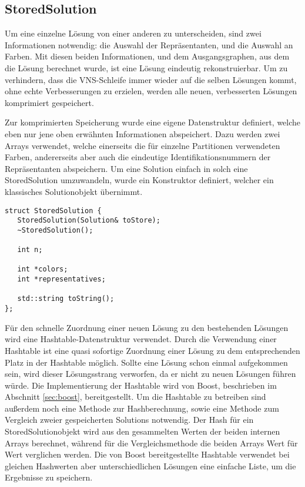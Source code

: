 \subsection{StoredSolution}
Um eine einzelne Lösung von einer anderen zu unterscheiden, sind zwei Informationen notwendig: die Auswahl der Repräsentanten, und die Auswahl 
an Farben. Mit diesen beiden Informationen, und dem Ausgangsgraphen, aus dem die Lösung berechnet wurde, ist eine Lösung eindeutig rekonstruierbar.
Um zu verhindern, dass die VNS-Schleife immer wieder auf die selben Lösungen kommt, ohne echte Verbesserungen zu erzielen, werden alle neuen, verbesserten
Lösungen komprimiert gespeichert. 

Zur komprimierten Speicherung wurde eine eigene Datenstruktur definiert, welche eben nur jene oben erwähnten Informationen abspeichert. 
Dazu werden zwei Arrays verwendet, welche einerseits die für einzelne Partitionen verwendeten Farben, andererseits aber auch die 
eindeutige Identifikationsnummern der Repräsentanten abspeichern. Um eine Solution einfach in solch eine StoredSolution umzuwandeln, wurde
ein Konstruktor definiert, welcher ein klassisches Solutionobjekt übernimmt. 

\singlespacing
\begin{lstlisting}[caption={Die Signatur von StoredSolution},label={lst:stored}]
struct StoredSolution {
   StoredSolution(Solution& toStore);
   ~StoredSolution();
   
   int n;
   
   int *colors;
   int *representatives;
   
   std::string toString();
};
\end{lstlisting}

Für den schnelle Zuordnung einer neuen Lösung zu den bestehenden Lösungen wird eine Hashtable-Datenstruktur verwendet. Durch die Verwendung einer
Hashtable ist eine quasi sofortige Zuordnung einer Lösung zu dem entsprechenden Platz in der Hashtable möglich. Sollte eine Lösung schon einmal 
aufgekommen sein, wird dieser Lösungsstrang verworfen, da er nicht zu neuen Lösungen führen würde. Die Implementierung der Hashtable wird von 
Boost, beschrieben im Abschnitt \ref{sec:boost}, bereitgestellt. Um die Hashtable zu betreiben sind außerdem noch eine Methode zur Hashberechnung,
sowie eine Methode zum Vergleich zweier gespeicherten Solutions notwendig. Der Hash für ein StoredSolutionobjekt wird aus den gesammelten Werten
der beiden internen Arrays berechnet, während für die Vergleichsmethode die beiden Arrays Wert für Wert verglichen werden. Die von Boost 
bereitgestellte Hashtable verwendet bei gleichen Hashwerten aber unterschiedlichen Lösungen eine einfache Liste, um die Ergebnisse zu speichern.

